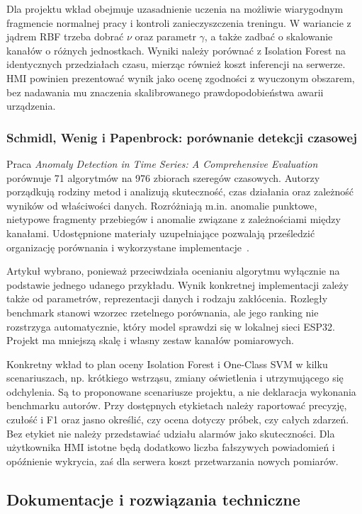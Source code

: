 \documentclass[12pt,a4paper]{article}
\begin{document}
Dla projektu wkład obejmuje uzasadnienie uczenia na możliwie wiarygodnym
fragmencie normalnej pracy i kontroli zanieczyszczenia treningu. W wariancie
z jądrem RBF trzeba dobrać $\nu$ oraz parametr $\gamma$, a także zadbać
o skalowanie kanałów o różnych jednostkach. Wyniki należy porównać
z Isolation Forest na identycznych przedziałach czasu, mierząc również
koszt inferencji na serwerze. HMI powinien prezentować wynik jako ocenę
zgodności z wyuczonym obszarem, bez nadawania mu znaczenia skalibrowanego
prawdopodobieństwa awarii urządzenia.

\subsubsection{Schmidl, Wenig i Papenbrock: porównanie detekcji czasowej}
Praca \emph{Anomaly Detection in Time Series: A Comprehensive Evaluation}
porównuje 71 algorytmów na 976 zbiorach szeregów czasowych. Autorzy
porządkują rodziny metod i analizują skuteczność, czas działania oraz
zależność wyników od właściwości danych. Rozróżniają m.in. anomalie punktowe,
nietypowe fragmenty przebiegów i anomalie związane z zależnościami między
kanałami. Udostępnione materiały uzupełniające pozwalają prześledzić
organizację porównania i wykorzystane implementacje~\cite{schmidl2022}.

Artykuł wybrano, ponieważ przeciwdziała ocenianiu algorytmu wyłącznie
na podstawie jednego udanego przykładu. Wynik konkretnej implementacji
zależy także od parametrów, reprezentacji danych i rodzaju zakłócenia.
Rozległy benchmark stanowi wzorzec rzetelnego porównania, ale jego ranking
nie rozstrzyga automatycznie, który model sprawdzi się w lokalnej sieci
ESP32. Projekt ma mniejszą skalę i własny zestaw kanałów pomiarowych.

Konkretny wkład to plan oceny Isolation Forest i One-Class SVM w kilku
scenariuszach, np. krótkiego wstrząsu, zmiany oświetlenia i utrzymującego
się odchylenia. Są to proponowane scenariusze projektu, a nie deklaracja
wykonania benchmarku autorów. Przy dostępnych etykietach należy raportować
precyzję, czułość i F1 oraz jasno określić, czy ocena dotyczy próbek,
czy całych zdarzeń. Bez etykiet nie należy przedstawiać udziału alarmów
jako skuteczności. Dla użytkownika HMI istotne będą dodatkowo liczba
fałszywych powiadomień i opóźnienie wykrycia, zaś dla serwera koszt
przetwarzania nowych pomiarów.

\subsection{Dokumentacje i rozwiązania techniczne}
\end{document}
